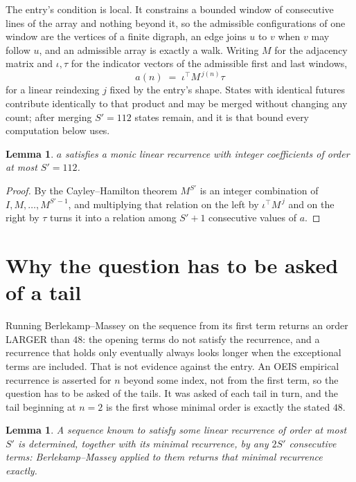 \documentclass[11pt,a4paper]{article}
\theoremstyle{plain}
\newtheorem{lemma}[theorem]{Lemma}
\theoremstyle{definition}
\begin{document}
The entry's condition is local. It constrains a bounded window of consecutive lines of the
array and nothing beyond it, so the admissible configurations of one window are the vertices of
a finite digraph, an edge joins $u$ to $v$ when $v$ may follow $u$, and an admissible array is
exactly a walk. Writing $M$ for the adjacency matrix and $\iota,\tau$ for the indicator vectors
of the admissible first and last windows,
\[
a(n)\;=\;\iota^{\!\top}M^{\,j(n)}\tau
\]
for a linear reindexing $j$ fixed by the entry's shape. States with identical futures
contribute identically to that product and may be merged without changing any count; after
merging $S'=112$ states remain, and it is that bound every computation below uses.

\begin{lemma}\label{lem:cf}
$a$ satisfies a monic linear recurrence with integer coefficients of order at most $S'=112$.
\end{lemma}

\begin{proof}
By the Cayley--Hamilton theorem $M^{S'}$ is an integer combination of $I,M,\dots,M^{S'-1}$,
and multiplying that relation on the left by $\iota^{\!\top}M^{\,j}$ and on the right by
$\tau$ turns it into a relation among $S'+1$ consecutive values of $a$.
\end{proof}

\section{Why the question has to be asked of a tail}

Running Berlekamp--Massey on the sequence from its first term returns an order LARGER than $48$: the opening terms do not satisfy the recurrence, and a recurrence that holds only eventually always looks longer when the exceptional terms are included. That is not evidence against the entry. An OEIS empirical recurrence is asserted for $n$ beyond some index, not from the first term, so the question has to be asked of the tails. It was asked of each tail in turn, and the tail beginning at $n=2$ is the first whose minimal order is exactly the stated $48$.

\begin{lemma}\label{lem:bm}
A sequence known to satisfy some linear recurrence of order at most $S'$ is determined,
together with its minimal recurrence, by any $2S'$ consecutive terms: Berlekamp--Massey applied
to them returns that minimal recurrence exactly.
\end{lemma}
\end{document}
